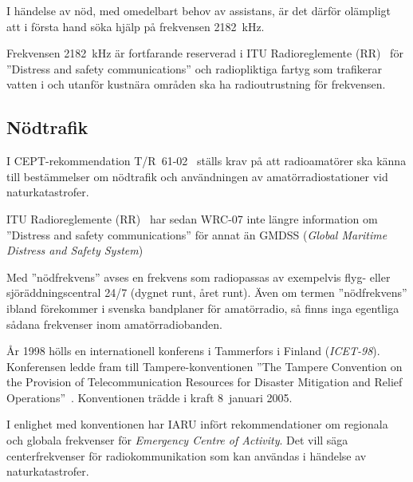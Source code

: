 \begin{center}
\begin{minipage}{0.19\columnwidth}
\Huge{\warningsymbol}
\end{minipage}
\begin{minipage}{0.7\columnwidth}
I händelse av nöd, med omedelbart behov av assistans, är det därför
olämpligt att i första hand söka hjälp på frekvensen \qty{2182}{\kilo\hertz}.
\end{minipage}
\end{center}

Frekvensen \qty{2182}{\kilo\hertz} är fortfarande reserverad i ITU
Radioreglemente (RR)~\cite{ITU-RR} för ''Distress and safety communications''
och radiopliktiga fartyg som trafikerar vatten i och utanför kustnära områden
ska ha radioutrustning för frekvensen.

\subsection{Nödtrafik}
\label{subsec:noedtrafik}

I CEPT-rekommendation T/R~61-02~\cite{TR6102} ställs krav på att radioamatörer
ska känna till bestämmelser om nödtrafik och användningen av
amatörradiostationer vid naturkatastrofer.

ITU Radioreglemente (RR)~\cite{ITU-RR} har sedan WRC-07 inte längre information
om ''Distress and safety communications'' för annat än
GMDSS (\emph{Global Maritime Distress and Safety System})

Med ''nödfrekvens'' avses en frekvens som radiopassas av exempelvis flyg- eller
sjöräddningscentral 24/7 (dygnet runt, året runt).
Även om termen ''nödfrekvens'' ibland förekommer i svenska bandplaner för
amatörradio, så finns inga egentliga sådana frekvenser inom amatörradiobanden.

År 1998 hölls en internationell konferens i Tammerfors i Finland
(\emph{ICET-98}).
Konferensen ledde fram till Tampere-konventionen ''The Tampere Convention on
the Provision of Telecommunication Resources for Disaster Mitigation and Relief
Operations''~\cite{TampereConvention}.
Konventionen trädde i kraft 8~januari 2005.

I enlighet med konventionen har IARU infört rekommendationer om regionala och
globala frekvenser för \emph{Emergency Centre of Activity}.
Det vill säga centerfrekvenser för radiokommunikation som kan användas i
händelse av naturkatastrofer.

